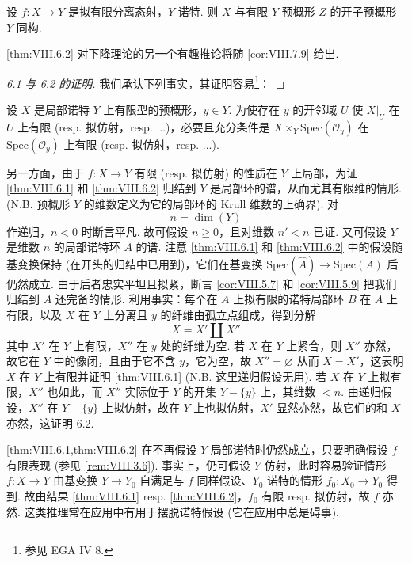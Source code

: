 \begin{corollary}\label{cor:VIII.6.4}
设 $f \colon X \to Y$ 是拟有限分离态射，$Y$ 诺特. 则 $X$ 与有限 $Y$-预概形 $Z$ 的开子预概形 $Y$-同构.
\end{corollary}

\ref{thm:VIII.6.2} 对下降理论的另一个有趣推论将随 \ref{cor:VIII.7.9} 给出.

\begin{proof}
[6.1 与 6.2 的证明] 我们承认下列事实，其证明容易\footnote{参见 EGA IV 8.}：
\end{proof}

\begin{lemma}\label{lem:VIII.6.5}
设 $X$ 是局部诺特 $Y$ 上有限型的预概形，$y \in Y$. 为使存在 $y$ 的开邻域 $U$ 使 $X|_U$ 在 $U$ 上有限 (resp. 拟仿射，resp. ...)，必要且充分条件是 $X \times_Y \mathrm{Spec}(\mathcal{O}_y)$ 在 $\mathrm{Spec}(\mathcal{O}_y)$ 上有限 (resp. 拟仿射，resp. ...).
\end{lemma}

另一方面，由于 $f \colon X \to Y$ 有限 (resp. 拟仿射) 的性质在 $Y$ 上局部，为证 \ref{thm:VIII.6.1} 和 \ref{thm:VIII.6.2} 归结到 $Y$ 是局部环的谱，从而尤其有限维的情形. (N.B. 预概形 $Y$ 的维数定义为它的局部环的 Krull 维数的上确界). 对
\[
n = \dim(Y)
\]
作递归，$n < 0$ 时断言平凡. 故可假设 $n \geqslant 0$，且对维数 $n' < n$ 已证. 又可假设 $Y$ 是维数 $n$ 的局部诺特环 $A$ 的谱. 注意 \ref{thm:VIII.6.1} 和 \ref{thm:VIII.6.2} 中的假设随基变换保持 (在开头的归结中已用到)，它们在基变换 $\mathrm{Spec}(\widehat{A}) \to \mathrm{Spec}(A)$ 后仍然成立. 由于后者忠实平坦且拟紧，断言 \ref{cor:VIII.5.7} 和 \ref{cor:VIII.5.9} 把我们归结到 $A$ 还完备的情形. 利用事实：每个在 $A$ 上拟有限的诺特局部环 $B$ 在 $A$ 上有限，以及 $X$ 在 $Y$ 上分离且 $y$ 的纤维由孤立点组成，得到分解
\[
X = X' \amalg X''
\]
其中 $X'$ 在 $Y$ 上有限，$X''$ 在 $y$ 处的纤维为空. 若 $X$ 在 $Y$ 上紧合，则 $X''$ 亦然，故它在 $Y$ 中的像闭，且由于它不含 $y$，它为空，故 $X'' = \varnothing$ 从而 $X = X'$，这表明 $X$ 在 $Y$ 上有限并证明 \ref{thm:VIII.6.1} (N.B. 这里递归假设无用). 若 $X$ 在 $Y$ 上拟有限，$X''$ 也如此，而 $X''$ 实际位于 $Y$ 的开集 $Y - \{y\}$ 上，其维数 $< n$. 由递归假设，$X''$ 在 $Y - \{y\}$ 上拟仿射，故在 $Y$ 上也拟仿射，$X'$ 显然亦然，故它们的和 $X$ 亦然，这证明 6.2.

\begin{remark}\label{rem:VIII.6.6}
\cref{thm:VIII.6.1,thm:VIII.6.2} 在不再假设 $Y$ 局部诺特时仍然成立，只要明确假设 $f$ 有限表现 (参见 \ref{rem:VIII.3.6}). 事实上，仍可假设 $Y$ 仿射，此时容易验证情形 $f \colon X \to Y$ 由基变换 $Y \to Y_0$ 自满足与 $f$ 同样假设、$Y_0$ 诺特的情形 $f_0 \colon X_0 \to Y_0$ 得到. 故由结果 \ref{thm:VIII.6.1} resp. \ref{thm:VIII.6.2}，$f_0$ 有限 resp. 拟仿射，故 $f$ 亦然. 这类推理常在应用中有用于摆脱诺特假设 (它在应用中总是碍事).
\end{remark}

